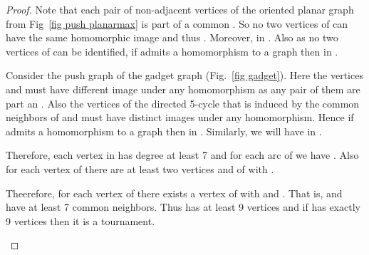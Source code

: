 \documentclass[10pt]{article}
\begin{document}
\begin{proof}
Note that each pair of  non-adjacent vertices of the oriented planar graph  from Fig~\ref{fig push planarmax}
is part of a common . 
So no two vertices of  can have the same homomorphic image 
and thus . 
Moreover,  in  . Also as no two vertices of  can be identified,
if  admits a homomorphism  to a graph  then   in 
. 

Consider the push graph  of the gadget graph  (Fig.~\ref{fig gadget}). Here  the vertices  and  must have different image under any homomorphism as any pair of them are part an . Also the vertices of the directed 5-cycle that is induced by the common neighbors of  and  must have distinct images under any homomorphism. Hence 
if  admits a homomorphism  to a graph  then   in 
. Similarly, we will have   in .




 Therefore,  each vertex in  has degree at least 7 and for each arc  of  we have . Also for each vertex  of  there are at least two vertices  and  of 
  with .



Theerefore,  for each vertex  of   there exists a 
 vertex  of 
with  and . That is,   and  have at least 7 common neighbors. Thus  has at least 
9 vertices and if  has exactly 9 vertices  then it is a tournament.

\medskip







\begin{figure} 


\centering
{}
\end{figure}
\end{proof}
\end{document}
